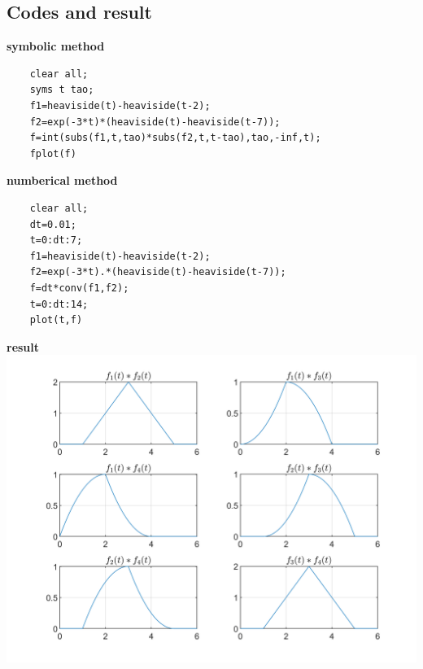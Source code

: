\documentclass[UTF8,a4paper]{article}
\begin{document}
\subsection{Codes and result}
\textbf{symbolic method}
\begin{lstlisting}
    clear all;
    syms t tao;
    f1=heaviside(t)-heaviside(t-2);
    f2=exp(-3*t)*(heaviside(t)-heaviside(t-7));
    f=int(subs(f1,t,tao)*subs(f2,t,t-tao),tao,-inf,t);
    fplot(f)
\end{lstlisting}
\textbf{numberical method}
\begin{lstlisting}
    clear all;
    dt=0.01;
    t=0:dt:7;
    f1=heaviside(t)-heaviside(t-2);
    f2=exp(-3*t).*(heaviside(t)-heaviside(t-7));
    f=dt*conv(f1,f2);
    t=0:dt:14;
    plot(t,f)\end{lstlisting}
\textbf{result}\\
\includegraphics[scale=0.8]{T3.png}
\end{document}
